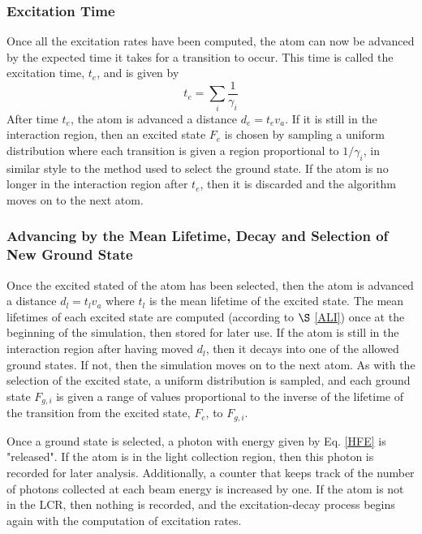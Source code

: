 \subsubsection{Excitation Time}
Once all the excitation rates have been computed, the atom can now be advanced by the expected time it takes for a transition to occur. This time is called the excitation time, $t_e$, and is given by
\begin{equation}
t_e = \sum_i \frac{1}{\gamma_i}
\end{equation}
After time $t_e$, the atom is advanced a distance $d_e = t_ev_a$. If it is still in the interaction region, then an excited state $F_e$ is chosen by sampling a uniform distribution where each transition is given a region proportional to $1/\gamma_i$, in similar style to the method used to select the ground state. If the atom is no longer in the interaction region after $t_e$, then it is discarded and the algorithm moves on to the next atom.

\subsubsection{Advancing by the Mean Lifetime, Decay and Selection of New Ground State}
Once the excited stated of the atom has been selected, then the atom is advanced a distance $d_l = t_lv_a$ where $t_l$ is the mean lifetime of the excited state. The mean lifetimes of each excited state are computed (according to $\S$ \ref{ALI}) once at the beginning of the simulation, then stored for later use. If the atom is still in the interaction region after having moved $d_l$, then it decays into one of the allowed ground states. If not, then the simulation moves on to the next atom. As with the selection of the excited state, a uniform distribution is sampled, and each ground state $F_{g,i}$ is given a range of values proportional to the inverse of the lifetime of the transition from the excited state, $F_{e}$, to $F_{g,i}$. 

Once a ground state is selected, a photon with energy given by Eq. \ref{HFE} is "released". If the atom is in the light collection region, then this photon is recorded for later analysis. Additionally, a counter that keeps track of the number of photons collected at each beam energy is increased by one. If the atom is not in the LCR, then nothing is recorded, and the excitation-decay process begins again with the computation of excitation rates.


